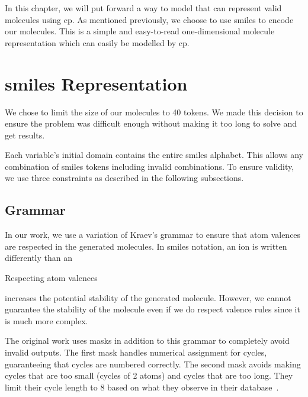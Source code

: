 \documentclass[../Document.tex]{subfiles}
\begin{document}
\label{chap:cp-validity}

In this chapter, we will put forward a way to model that can represent valid molecules using \gls{cp}.
As mentioned previously, we choose to use \gls{smiles} to encode our molecules. This is a simple and easy-to-read one-dimensional molecule representation which can easily be modelled by \gls{cp}.


\section{\gls{smiles} Representation}
We chose to limit the size of our molecules to 40 tokens. We made this decision to ensure the problem was difficult enough without making it too long to solve and get results.

Each variable's initial domain contains the entire \gls{smiles} alphabet. This allows any combination of \gls{smiles} tokens including invalid combinations. To ensure validity, we use three constraints as described in the following subsections.


\subsection{Grammar}
In our work, we use a variation of Kraev's grammar \cite{kraev2018grammars} to ensure that atom valences are respected in the generated molecules. In \gls{smiles} notation, an ion  is written differently than an 

Respecting atom valences

increases the potential stability of the generated molecule. However, we cannot guarantee the stability of the molecule even if we do respect valence rules since it is much more complex.

The original work uses masks in addition to this grammar to completely avoid invalid outputs.
The first mask handles numerical assignment for cycles, guaranteeing that cycles are numbered correctly.
The second mask avoids making cycles that are too small (\ie cycles of 2 atoms) and cycles that are too long. They limit their cycle length to 8 based on what they observe in their database~\cite{kraev2018grammars}.
\end{document}
